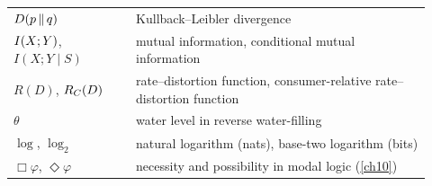 \begin{center}
\begin{tabular}{@{}p{0.27\linewidth}p{0.65\linewidth}@{}}
$D\!\left(p\,\middle\|\,q\right)$ & Kullback--Leibler divergence \\
$I(X;Y)$, $I(X;Y\mid S)$ & mutual information, conditional mutual information \\
$R(D)$, $R_C(D)$ & rate--distortion function, consumer-relative rate--distortion function \\
$\theta$ & water level in reverse water-filling \\
$\log$, $\log_2$ & natural logarithm (nats), base-two logarithm (bits) \\
$\Box\varphi$, $\Diamond\varphi$ & necessity and possibility in modal logic (\cref{ch10}) \\
\bottomrule
\end{tabular}
\end{center}
